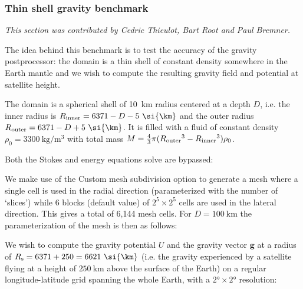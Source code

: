 \documentclass{article}
\begin{document}
\subsubsection{Thin shell gravity benchmark}
\label{sec:benchmark-thin-shell-gravity}

\textit{This section was contributed by Cedric Thieulot, Bart Root and Paul Bremner.}

The idea behind this benchmark is to test the accuracy of the gravity postprocessor: the domain is a thin shell of constant density somewhere in the Earth mantle and we wish to compute the resulting gravity field and potential at satellite height.

The domain is a spherical shell of 10~\si{\km} radius centered at a depth $D$, i.e. the inner radius is $R\textsubscript{inner}=6371-D-5~\si{\km}$ and the outer radius $R\textsubscript{outer}=6371-D+5~ \si{\km}$. It is filled with a fluid of constant density $\rho_0=3300~\si{\kg\per\cubic\meter}$ with total mass $M=\frac43 \pi (R\textsubscript{outer}^3-R\textsubscript{inner}^3)\rho_0$.

Both the Stokes and energy equations solve are bypassed:



We make use of the Custom mesh subdivision option to generate a mesh where a single cell is used in the radial direction (parameterized with the number of `slices') while 6 blocks (default value) of $2^5\times 2^5$ cells are used in the lateral direction. This gives a total of 6,144 mesh cells. For $D=100~\si{\km}$ the parameterization of the mesh is then as follows:



We wish to compute the gravity potential $U$ and the gravity vector ${\mathbf g}$ at a radius of $R\textsubscript{s}=6371+250=6621~\si{\km}$ (i.e. the gravity experienced by a satellite flying at a height of $250~\si{\km}$ above the surface of the Earth) on a regular longitude-latitude grid spanning the whole Earth, with a $2\si{\degree}\times 2\si{\degree}$ resolution:


\end{document}

